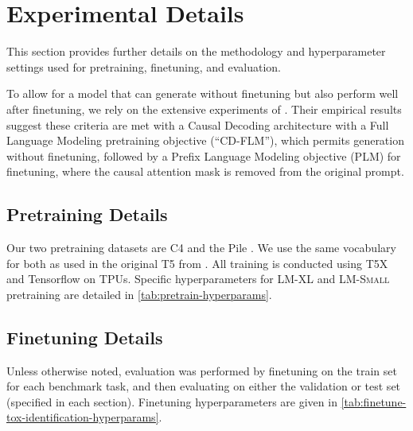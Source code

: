 \documentclass{article}
\newcommand{\smalLM}[0]{\textsc{LM-Small}}
\newcommand{\bigLM}[0]{\textsc{LM-XL}}
\begin{document}


\vspace{-3mm}
\section{Experimental Details}
\label{sec:app-exp-details}
This section provides further details on the methodology and hyperparameter settings used for pretraining, finetuning, and evaluation.

To allow for a model that can generate without finetuning but also perform well after finetuning, we rely on the extensive experiments of \citet{wang2022language}.
Their empirical results suggest these criteria are met with a Causal Decoding architecture with a Full Language Modeling pretraining objective (``CD-FLM''), which permits generation without finetuning, followed by a Prefix Language Modeling objective (PLM) for finetuning, where the causal attention mask is removed from the original prompt.

\vspace{-3mm}
\subsection{Pretraining Details}
\label{app:pretrain-hps}

Our two pretraining datasets are C4 \citep{raffel2020exploring} and the Pile \citep{gao-etal-2021-making}.
We use the same vocabulary for both as used in the original T5 from \citet{raffel2020exploring}.
All training is conducted using T5X \citep{roberts2022t5x} and Tensorflow \citep{abadi2016tensorflow} on TPUs.
Specific hyperparameters for \bigLM{} and \smalLM{} pretraining are detailed in \cref{tab:pretrain-hyperparams}.



\vspace{-3mm}
\subsection{Finetuning Details}
\label{app:finetune-toxicity-hps}
Unless otherwise noted, evaluation was performed by finetuning on the train set for each benchmark task, and then evaluating on either the validation or test set (specified in each section).
Finetuning hyperparameters are given in \cref{tab:finetune-tox-identification-hyperparams}.


\end{document}
